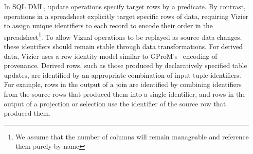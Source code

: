 In SQL DML, update operations specify target rows by a predicate.
By contrast, operations in a spreadsheet explicitly target specific rows of data, requiring Vizier to assign unique identifiers to each record to encode their order in the spreadsheet\footnote{We assume that the number of columns will remain manageable and reference them purely by name}.
To allow Vizual operations to be replayed as source data changes, these identifiers should remain stable through data transformations.
For derived data, Vizier uses a row identity model similar to GProM's~\cite{DBLP:journals/debu/ArabFGLNZ17} encoding of provenance.
Derived rows, such as those produced by declaratively specified table updates, are identified by an appropriate combination of input tuple identifiers. For example, rows in the output of a join are identified by combining identifiers from the source rows that produced them into a single identifier, and rows in the output of a projection or selection use the identifier of the source row that produced them.

